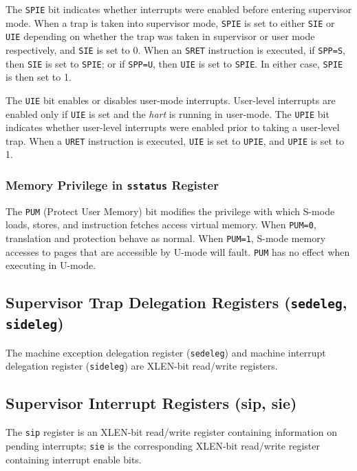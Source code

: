 The {\tt SPIE} bit indicates whether interrupts were enabled before entering
supervisor mode. When a trap is taken into supervisor mode, {\tt SPIE} is set
to either {\tt SIE} or {\tt UIE} depending on whether the trap was taken in
supervisor or user mode respectively, and {\tt SIE} is set to 0. When an {\tt SRET}
instruction is executed, if {\tt SPP=S}, then {\tt SIE} is set to {\tt SPIE}; or if {\tt SPP=U},
then {\tt UIE} is set to {\tt SPIE}. In either case, {\tt SPIE} is then set to 1.

The {\tt UIE} bit enables or disables user-mode interrupts. User-level
interrupts are enabled only if {\tt UIE} is set and the \emph{hart} is running
in user-mode. The {\tt UPIE} bit indicates whether user-level interrupts were
enabled prior to taking a user-level trap. When a {\tt URET} instruction is
executed, {\tt UIE} is set to {\tt UPIE}, and {\tt UPIE} is set to 1.

\subsubsection{Memory Privilege in {\tt sstatus} Register
}\label{memory-privilege-in-sstatus-register}

The {\tt PUM} (Protect User Memory) bit modifies the privilege with which
S-mode loads, stores, and instruction fetches access virtual memory.
When {\tt PUM=0}, translation and protection behave as normal. When {\tt PUM=1},
S-mode memory accesses to pages that are accessible by U-mode will fault. {\tt PUM} has no effect when executing in U-mode.

\subsection{Supervisor Trap Delegation Registers ({\tt sedeleg},
{\tt sideleg})}\label{supervisor-trap-delegation-registers-sedeleg-sideleg}

The machine exception delegation register ({\tt sedeleg}) and machine
interrupt delegation register ({\tt sideleg}) are XLEN-bit read/write
registers.

\subsection{Supervisor Interrupt Registers (sip, sie)}

The {\tt sip} register is an XLEN-bit read/write register containing
information on pending interrupts; {\tt sie} is the corresponding XLEN-bit
read/write register containing interrupt enable bits.

